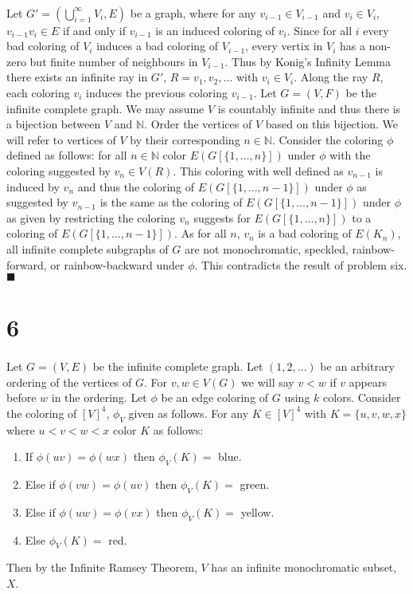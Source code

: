 \documentclass[letterpaper,12pt,oneside,onecolumn]{article}
\newcommand{\N}{\mathbb{N}} \newcommand{\R}{\mathbb{R}}
\begin{document}
\paragraph{}
Let $G' = (\bigcup_{i=1}^\infty V_i, E)$ be a graph, where for any $v_{i-1} \in V_{i-1}$ and $ v_i \in V_i$, $v_{i-1}v_i \in E$ if and only if $v_{i-1}$ is an induced coloring of $v_i$. Since for all $i$ every bad coloring of $V_i$ induces a bad coloring of $V_{i-1}$, every vertix in $V_i$ has a non-zero but finite number of neighbours in $V_{i-1}$. Thus by Konig's Infinity Lemma there exists an infinite ray in $G'$, $R=v_1,v_2,\dots$ with $v_i \in V_i$. Along the ray $R$, each coloring $v_i$ induces the previous coloring $v_{i-1}$. Let $G=(V,F)$ be the infinite complete graph. We may assume $V$ is countably infinite and thus there is a bijection between $V$ and $\N$. Order the vertices of $V$ based on this bijection. We will refer to vertices of $V$ by their corresponding $n \in \N$. Consider the coloring $\phi$ defined as follows: for all $n \in \N$ color $E(G[\{1,\dots,n\}])$ under $\phi$ with the coloring suggested by $v_n \in V(R)$. This coloring with well defined as $v_{n-1}$ is induced by $v_n$ and thus the coloring of $E(G[\{1,\dots,n-1\}])$ under $\phi$ as suggested by $v_{n-1}$ is the same as the coloring of $E(G[\{1,\dots,n-1\}])$ under $\phi$ as given by restricting the coloring $v_n$ suggests for $E(G[\{1,\dots,n\}])$ to a coloring of $E(G[\{1,\dots, n-1\}])$. As for all $n$, $v_n$ is a bad coloring of $E(K_n)$, all infinite complete subgraphs of $G$ are not monochromatic, speckled, rainbow-forward, or rainbow-backward under $\phi$. This contradicts the result of problem six. $\blacksquare$
\section*{6}
\paragraph{}
Let $G=(V,E)$ be the infinite complete graph. Let $(1,2,\dots)$ be an arbitrary ordering of the vertices of $G$. For $v,w \in V(G)$ we will say $v < w$ if $v$ appears before $w$ in the ordering. Let $\phi$ be an edge coloring of $G$ using $k$ colors. Consider the coloring of $[V]^4$, $\phi_V$ given as follows. For any $K \in [V]^4$ with $K = \{u,v,w,x\}$ where $u<v<w<x$ color $K$ as follows:
\begin{enumerate}
\item If $\phi(uv) = \phi(wx)$ then $\phi_V(K)=$ blue.
\item Else if $\phi(vw)=\phi(uv)$ then $\phi_V(K)=$ green.
\item Else if $\phi(uw) = \phi(vx)$ then $\phi_V(K)=$ yellow.
\item Else $\phi_V(K)=$  red.
\end{enumerate}
Then by the Infinite Ramsey Theorem, $V$ has an infinite monochromatic subset, $X$.
\end{document}
